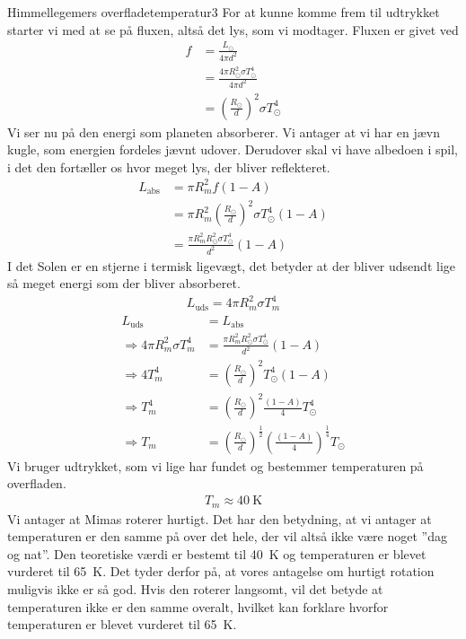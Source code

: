 \begin{opgave}{Himmellegemers overfladetemperatur}{3}
	\opg For at kunne komme frem til udtrykket starter vi med at se på fluxen, altså det lys, som vi modtager. Fluxen er givet ved
	\begin{align*}
	f &= \frac{L_\odot}{4\pi d^2}\\
	&= \frac{4\pi R_\odot^2 \sigma T_\odot^4}{4\pi d^2}\\
	&= \left( \frac{R_\odot}{d}\right) ^2 \sigma T_\odot^4
	\end{align*}
	Vi ser nu på den energi som planeten absorberer. Vi antager at vi har en jævn kugle, som energien fordeles jævnt udover. Derudover skal vi have albedoen i spil, i det den fortæller os hvor meget lys, der bliver reflekteret. 
	\begin{align*}
	L_\text{abs} &= \pi R_{m}^2 f \left( 1-A\right) \\
	&= \pi R_{m}^2 \left( \frac{R_\odot}{d}\right) ^2 \sigma T_\odot^4 \left( 1-A\right)\\
	&= \frac{\pi R_m^2R_\odot^2 \sigma T_\odot^4}{d^2} \left( 1-A\right) 
	\end{align*}
	\opg I det Solen er en stjerne i termisk ligevægt, det betyder at der bliver udsendt lige så meget energi som der bliver absorberet. 
	\begin{align*}
	L_\text{uds} = 4\pi R_m^2 \sigma T_m^4
	\end{align*}
	\begin{align*}
	L_\text{uds} &= L_\text{abs} \\
	\Rightarrow 4\pi R_m^2 \sigma T_m^4 &= \frac{\pi R_m^2R_\odot^2 \sigma T_\odot^4}{d^2} \left( 1-A\right) \\
	\Rightarrow 4T_m^4 &= \left( \frac{R_\odot}{d} \right) ^2 T_\odot^4 \left( 1-A\right) \\
	\Rightarrow T_m^4 &= \left( \frac{R_\odot}{d} \right) ^2 \frac{\left( 1-A\right)}{4} T_\odot^4\\ 
	\Rightarrow T_m &= \left( \frac{R_\odot}{d} \right) ^{\frac{1}{2}} \left( \frac{\left( 1-A \right) }{4} \right) ^{\frac{1}{4}} T_\odot
	\end{align*}
	\opg Vi bruger udtrykket, som vi lige har fundet og bestemmer temperaturen på overfladen. 
	\begin{align*}
	T_m \approx \SI{40}{\kelvin}
	\end{align*}
	\opg Vi antager at Mimas roterer hurtigt. Det har den betydning, at vi antager at temperaturen er den samme på over det hele, der vil altså ikke være noget ''dag og nat''. Den teoretiske værdi er bestemt til \SI{40}{\kelvin} og temperaturen er blevet vurderet til \SI{65}{\kelvin}. Det tyder derfor på, at vores antagelse om hurtigt rotation muligvis ikke er så god. Hvis den roterer langsomt, vil det betyde at temperaturen ikke er den samme overalt, hvilket kan forklare hvorfor temperaturen er blevet vurderet til \SI{65}{\kelvin}. 
\end{opgave}
